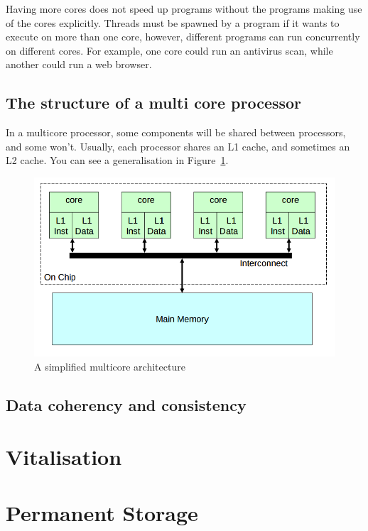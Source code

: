 Having more cores does not speed up programs without the programs making use of
the cores explicitly. Threads must be spawned by a program if it wants to
execute on more than one core, however, different programs can run concurrently
on different cores. For example, one core could run an antivirus scan, while
another could run a web browser.

\subsection{The structure of a multi core processor}

In a multicore processor, some components will be shared between processors, and
some won't. Usually, each processor shares an L1 cache, and sometimes an L2
cache. You can see a generalisation in Figure~\ref{multicore-arch}.

\begin{figure}
  \includegraphics[width=\textwidth]{images/multicore-arch}
  \caption{A simplified multicore architecture}
  \label{multicore-arch}
\end{figure}

\subsection{Data coherency and consistency}


\section{Vitalisation}

\section{Permanent Storage}
